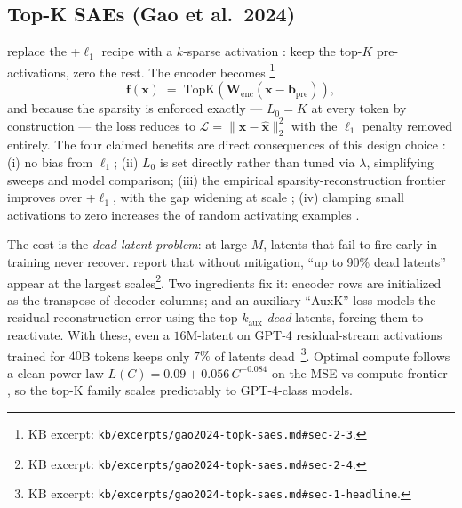 \subsection{Top-K SAEs (Gao et al.\ 2024)}
\label{sec:sae-topk}

\citet{gao2024-topk-saes} replace the +$\ell_1$ recipe with a
$k$-sparse activation \citep[after][]{gao2024-topk-saes}: keep the
top-$K$ pre-activations, zero the rest. The encoder becomes
\citep[\S 2.3, Eq.~2]{gao2024-topk-saes}\footnote{KB excerpt:
\nolinkurl{kb/excerpts/gao2024-topk-saes.md#sec-2-3}.}
\begin{equation}
  \mathbf{f}(\mathbf{x}) \;=\; \mathrm{TopK}\!\left(\mathbf{W}_{\text{enc}}(\mathbf{x} - \mathbf{b}_{\text{pre}})\right),
  \label{eq:topk}
\end{equation}
and because the sparsity is enforced exactly --- $L_0 = K$ at every
token by construction --- the loss reduces to
$\mathcal{L} = \|\mathbf{x} - \hat{\mathbf{x}}\|_2^2$ with the $\ell_1$
penalty removed entirely. The four claimed benefits are direct
consequences of this design choice
\citep[\S 2.3]{gao2024-topk-saes}: (i) no  bias from $\ell_1$;
(ii) $L_0$ is set directly rather than tuned via $\lambda$, simplifying
sweeps and model comparison; (iii) the empirical sparsity-reconstruction
frontier improves over +$\ell_1$, with the gap widening at scale
\citep[Fig.~2b]{gao2024-topk-saes}; (iv) clamping small activations to
zero increases the  of random activating examples
\citep[\S 4.3]{gao2024-topk-saes}.

The cost is the \emph{dead-latent problem}: at large $M$, latents that
fail to fire early in training never recover. \citet{gao2024-topk-saes}
report that without mitigation, ``up to 90\% dead
latents''~\citep[\S 2.4]{gao2024-topk-saes} appear at the largest
scales\footnote{KB excerpt:
\nolinkurl{kb/excerpts/gao2024-topk-saes.md#sec-2-4}.}. Two ingredients
fix it: encoder rows are initialized as the transpose of decoder
columns; and an auxiliary ``AuxK'' loss models the residual
reconstruction error using the top-$k_{\text{aux}}$ \emph{dead}
latents, forcing them to reactivate. With these, even a
$16$M-latent  on GPT-4 residual-stream activations trained for $40$B
tokens keeps only $7\%$ of latents
dead~\citep[\S 1, \S 2.4]{gao2024-topk-saes}\footnote{KB excerpt:
\nolinkurl{kb/excerpts/gao2024-topk-saes.md#sec-1-headline}.}. Optimal
compute follows a clean power law $L(C) = 0.09 + 0.056\,C^{-0.084}$ on
the MSE-vs-compute frontier \citep[Fig.~1, \S 3]{gao2024-topk-saes}, so
the top-K family scales predictably to GPT-4-class models.

